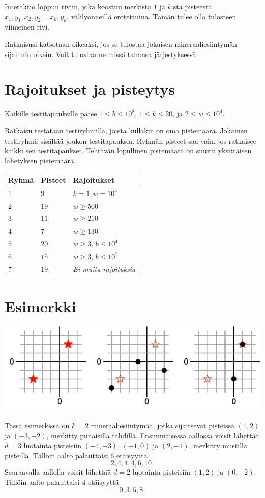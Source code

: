 Interaktio loppuu riviin, joka koostuu merkistä \texttt{!} ja $k$:sta pisteestä $x_1, y_1, x_2, y_2, \ldots x_k, y_k$, välilyönneillä erotettuina.
Tämän tulee olla tulosteen viimeinen rivi.

Ratkaisusi katsotaan oikeaksi, jos se tulostaa jokaisen mineraaliesiintymän sijainnin oikein.
Voit tulostaa ne missä tahansa järjestyksessä.

\section*{Rajoitukset ja pisteytys}

Kaikille testitapauksille pätee
$1\leq b \leq 10^8$, %
$1 \leq k \leq 20$, %
ja
$2 \le w \le 10^4$. %

Ratkaisu testataan testiryhmillä, joista kullakin on oma pistemäärä.
Jokainen testiryhmä sisältää joukon testitapauksia.
Ryhmän pisteet saa vain, jos ratkaisee kaikki sen testitapaukset.
Tehtävän lopullinen pistemäärä on suurin yksittäisen lähetyksen pistemäärä.

\medskip
\begin{tabular}{lll}
Ryhmä & Pisteet & Rajoitukset \\\hline
  $1$ & $9$ & $k = 1, w = 10^4$\\
  $2$ & $19$ & $w \ge 500$\\
  $3$ & $11$ & $w \ge 210$\\
  $4$ & $7$ & $w \ge 130$\\
  $5$ & $20$ & $w \ge 3$, $b \le 10^4$\\
  $6$ & $15$ & $w \ge 3$, $b \le 10^7$\\
  $7$ & $19$ & \emph{Ei muita rajoituksia}
\end{tabular}

\section*{Esimerkki}

\includegraphics[width=.6\textwidth]{img/sample1.pdf}

Tässä esimerkissä on $k=2$ mineraaliesiintymää, jotka sijaitsevat pisteissä $(1,2)$ ja $(-3,-2)$, merkitty punaisilla tähdillä.
Ensimmäisessä aallossa voisit lähettää $d=3$ luotainta pisteisiin $(-4,-3)$, $(-1, 0)$ ja $(2,-1)$, merkitty mustilla pisteillä.
Tällöin aalto palauttaisi $6$ etäisyyttä \[
  2, 4, 4, 4, 6, 10\,.
\]
Seuraavalla aallolla voisit lähettää $d=2$ luotainta pisteisiin $(1,2)$ ja $(0,-2)$.
Tällöin aalto palauttaisi $4$ etäisyyttä \[
  0, 3, 5, 8\,.
\]
